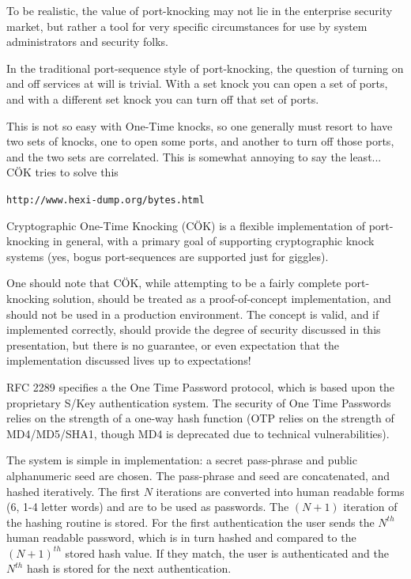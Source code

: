 \documentclass[landscape,twocolumn,headrule]{foils}
\begin{document}
To be realistic, the value of port-knocking may not lie in the enterprise security market, but rather a tool for very specific circumstances for use by system administrators and security folks.


In the traditional port-sequence style of port-knocking, the question of turning on and off services at will is trivial.  With a set knock you can open a set of ports, and with a different set knock you can turn off that set of ports.

This is not so easy with One-Time knocks, so one generally must resort to have two sets of knocks, one to open some ports, and another to turn off those ports, and the two sets are correlated.  This is somewhat annoying to say the least...  C\"{O}K tries to solve this


\verb;http://www.hexi-dump.org/bytes.html;

Cryptographic One-Time Knocking (C\"{O}K) is a flexible implementation of port-knocking in general,  with a primary goal of supporting cryptographic knock systems (yes, bogus port-sequences are supported just for giggles).

One should note that C\"{O}K, while attempting to be a fairly complete port-knocking solution, should be treated as a proof-of-concept implementation, and should not be used in a production environment.  The concept is valid, and if implemented correctly, should provide the degree of security discussed in this presentation, but there is no guarantee, or even expectation that the implementation discussed lives up to expectations!


RFC 2289\cite{rfc2289} specifies a the One Time Password protocol, which is based upon the proprietary S/Key authentication system.  The security of One Time Passwords relies on the strength of a one-way hash function (OTP relies on the strength of MD4/MD5/SHA1, though MD4 is deprecated due to technical vulnerabilities).

The system is simple in implementation: a secret pass-phrase and public alphanumeric seed are chosen.  The pass-phrase and seed are concatenated, and hashed iteratively.  The first $N$ iterations are converted into human readable forms (6, 1-4 letter words) and are to be used as passwords.  The $(N\!\!+\!\!1)$ iteration of the hashing routine is stored.  For the first authentication the user sends the $N^{th}$ human readable password, which is in turn hashed and compared to the $(N\!\!+\!\!1)^{th}$ stored hash value.  If they match, the user is authenticated and the $N^{th}$ hash is stored for the next authentication.
\end{document}
